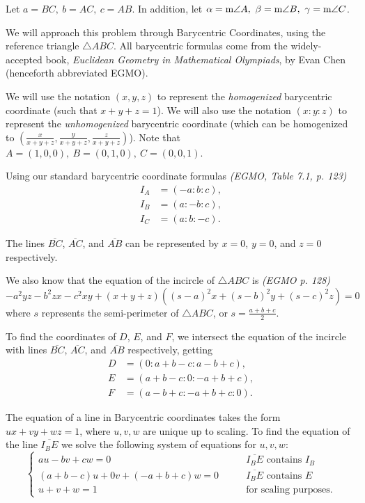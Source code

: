 \documentclass[12pt]{article}
\begin{document}
\begin{solution}{5}
    \indent
    Let $a=BC,\ b=AC,\ c=AB$.
    In addition, let $\alpha = \text m\angle A,\ \beta = \text m\angle B,\ \gamma = \text m\angle C$.

    We will approach this problem through Barycentric Coordinates, using the reference triangle $\triangle ABC$.
    All barycentric formulas come from the widely-accepted book, \textit{Euclidean Geometry in Mathematical Olympiads},
    by Evan Chen (henceforth abbreviated EGMO).
    
    We will use the notation $(x,y,z)$ to represent the \textit{homogenized} barycentric coordinate
    (such that $x + y + z = 1$). We will also use the notation $(x:y:z)$ to represent the \textit{unhomogenized}
    barycentric coordinate (which can be homogenized to $(\frac x{x+y+z}, \frac y{x+y+z}, \frac z{x+y+z})$).
    Note that $A=(1, 0, 0),\ B=(0, 1, 0),\ C=(0, 0, 1)$.
    
    Using our standard barycentric coordinate formulas \textit{(EGMO, Table 7.1, p. 123)}
    \begin{align*}
        I_A &= (-a : b : c), \\
        I_B &= (a : -b : c), \\
        I_C &= (a : b : -c).
    \end{align*}
    
    The lines $\overline{BC}$, $\overline{AC}$, and $\overline{AB}$ can be represented by
    $x=0$, $y=0$, and $z=0$ respectively.

    We also know that the equation of the incircle of $\triangle ABC$ is \textit{(EGMO p. 128)}
    \begin{equation*}
        -a^2yz-b^2zx-c^2xy + (x+y+z)((s-a)^2x+(s-b)^2y+(s-c)^2z) = 0
    \end{equation*}
    where $s$ represents the semi-perimeter of $\triangle ABC$, or $s=\frac{a+b+c}2$.
    
    To find the coordinates of $D$, $E$, and $F$, we intersect the equation of the incircle with
    lines $\overline{BC}$, $\overline{AC}$, and $\overline{AB}$ respectively, getting
    \begin{align*}
        D &= (0:a+b-c : a-b+c),\\
        E &= (a+b-c:0:-a+b+c),\\
        F &= (a-b+c : -a+b+c : 0).
    \end{align*}
    
    The equation of a line in Barycentric coordinates takes the form $ux+vy+wz=1$, where $u,v,w$ are unique up to scaling.
    To find the equation of the line $\overline{I_B E}$ we solve the following system of equations for $u,v,w$:
    \begin{equation*}
        \begin{cases}
            au-bv+cw = 0 &\qquad\text{$\overline{I_BE}$ contains $I_B$} \\
            (a+b-c)u+0v+(-a+b+c)w = 0 &\qquad\text{$\overline{I_BE}$ contains $E$} \\
            u+v+w = 1 &\qquad\text{for scaling purposes.}
        \end{cases}
    \end{equation*}
    

\end{solution}
\end{document}
